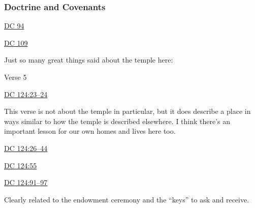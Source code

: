 		
		
	\subsubsection{Doctrine and Covenants} %
		\label{TEMPLE-DC}
	
		
		\begin{compactdesc}
			\item[{\hyperref[DC94]{DC 94}}]
			\item[{\hyperref[DC109]{DC 109}}]
				\begin{compactitem}
					\item Just so many great things said about the temple here:
						\begin{compactitem}
							\item Verse 5
						\end{compactitem}
				\end{compactitem}
			\item[{\hyperref[DC124-23]{DC 124:23--24}}]
				\begin{compactitem}
					\item This verse is not about the temple in particular, but it does describe a place in ways similar to how the temple is described elsewhere. I think there's an important lesson for our own homes and lives here too.
				\end{compactitem}
			\item[{\hyperref[DC124-26]{DC 124:26--44}}]
			\item[{\hyperref[DC124-55]{DC 124:55}}]
			\item[{\hyperref[DC124-91]{DC 124:91--97}}]
				\begin{compactitem}
					\item Clearly related to the endowment ceremony and the ``keys'' to ask and receive.
				\end{compactitem}
		\end{compactdesc}
		
